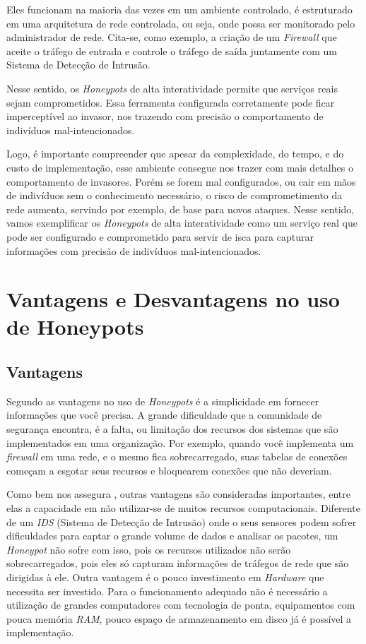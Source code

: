 Eles funcionam na maioria das vezes em um ambiente controlado, é estruturado em uma arquitetura de rede controlada, ou seja, onde possa ser monitorado pelo administrador de rede. Cita-se, como exemplo, a criação de um \textit{Firewall} que aceite o tráfego de entrada e controle o tráfego de saída juntamente com um Sistema de Detecção de Intrusão.

Nesse sentido, os \textit{Honeypots} de alta interatividade permite que serviços reais sejam comprometidos. Essa ferramenta configurada corretamente pode ficar imperceptível ao invasor, nos trazendo com precisão o comportamento de indivíduos mal-intencionados.

Logo, é importante compreender que apesar da complexidade, do tempo, e do custo de implementação, esse ambiente consegue nos trazer com mais detalhes o comportamento de invasores. Porém se forem mal configurados, ou cair em mãos de indivíduos sem o conhecimento necessário, o risco de comprometimento da rede aumenta, servindo por exemplo, de base para novos ataques. Nesse sentido, vamos exemplificar os \textit{Honeypots} de alta interatividade como um serviço real que pode ser configurado e comprometido para servir de isca para capturar informações com precisão de indivíduos mal-intencionados.

\section{Vantagens e Desvantagens no uso de Honeypots}
\subsection{Vantagens}
Segundo  as vantagens no uso de \textit{Honeypots} é a simplicidade em fornecer informações que você precisa. A grande dificuldade que a comunidade de segurança encontra, é a falta, ou limitação dos recursos dos sistemas que são implementados em uma organização. Por exemplo, quando você implementa um \textit{firewall} em uma rede, e o mesmo fica sobrecarregado, suas tabelas de conexões começam a esgotar seus recursos e bloquearem conexões que não deveriam. 

Como bem nos assegura , outras vantagens são consideradas importantes, entre elas a capacidade em não utilizar-se de muitos recursos computacionais. Diferente de um \textit{IDS} (Sistema de Detecção de Intrusão) onde o seus sensores podem sofrer dificuldades para captar o grande volume de dados e analisar os pacotes, um \textit{Honeypot} não sofre com isso, pois os recursos utilizados não serão sobrecarregados, pois eles só capturam informações de tráfegos de rede que são dirigidas à ele. Outra vantagem é o pouco investimento em \textit{Hardware} que necessita ser investido. Para o funcionamento adequado não é necessário a utilização de grandes computadores com tecnologia de ponta, equipamentos com pouca memória \textit{RAM}, pouco espaço de armazenamento em disco já é possível a implementação.

